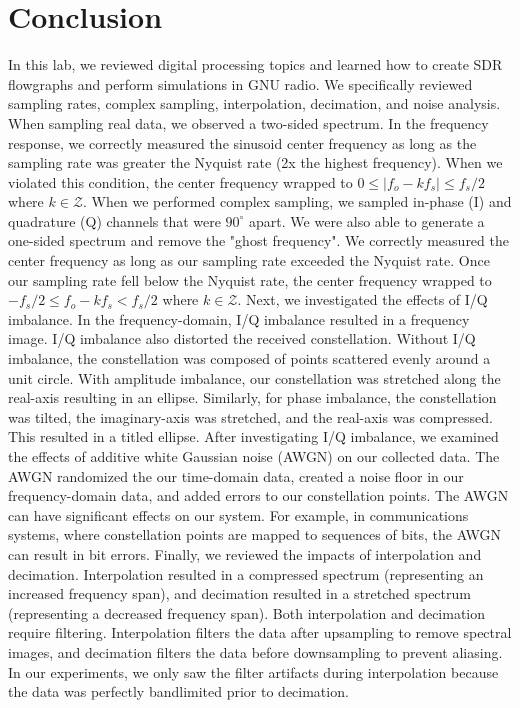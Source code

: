 \documentclass{article}
\begin{document}



\section{Conclusion}

In this lab, we reviewed digital processing topics and learned how to create SDR flowgraphs and perform simulations in GNU radio. We specifically reviewed sampling rates, complex sampling, interpolation, decimation, and noise analysis. When sampling real data, we observed a two-sided spectrum. In the frequency response, we correctly measured the sinusoid center frequency as long as the sampling rate was greater the Nyquist rate (2x the highest frequency). When we violated this condition, the center frequency wrapped to $0 \leq |f_o - kf_s| \leq f_s/2$ where $k \in \mathcal{Z}$. When we performed complex sampling, we sampled in-phase (I) and quadrature (Q) channels that were $90^\circ$ apart. We were also able to generate a one-sided spectrum and remove the "ghost frequency". We correctly measured the center frequency as long as our sampling rate exceeded the Nyquist rate. Once our sampling rate fell below the Nyquist rate, the center frequency wrapped to $-f_s/2 \leq f_o - kf_s < f_s/2$ where $k \in \mathcal{Z}$. Next, we investigated the effects of I/Q imbalance. In the frequency-domain, I/Q imbalance resulted in a frequency image. I/Q imbalance also distorted the received constellation. Without I/Q imbalance, the constellation was composed of points scattered evenly around a unit circle. With amplitude imbalance, our constellation was stretched along the real-axis resulting in an ellipse. Similarly, for phase imbalance, the constellation was tilted, the imaginary-axis was stretched, and the real-axis was compressed. This resulted in a titled ellipse. After investigating I/Q imbalance, we examined the effects of additive white Gaussian noise (AWGN) on our collected data. The AWGN randomized the our time-domain data, created a noise floor in our frequency-domain data, and added errors to our constellation points. The AWGN can have significant effects on our system. For example, in communications systems, where constellation points are mapped to sequences of bits, the AWGN can result in bit errors. Finally, we reviewed the impacts of interpolation and decimation. Interpolation resulted in a compressed spectrum (representing an increased frequency span), and decimation resulted in a stretched spectrum (representing a decreased frequency span). Both interpolation and decimation require filtering. Interpolation filters the data after upsampling to remove spectral images, and decimation filters the data before downsampling to prevent aliasing. In our experiments, we only saw the filter artifacts during interpolation because the data was perfectly bandlimited prior to decimation.
\end{document}
